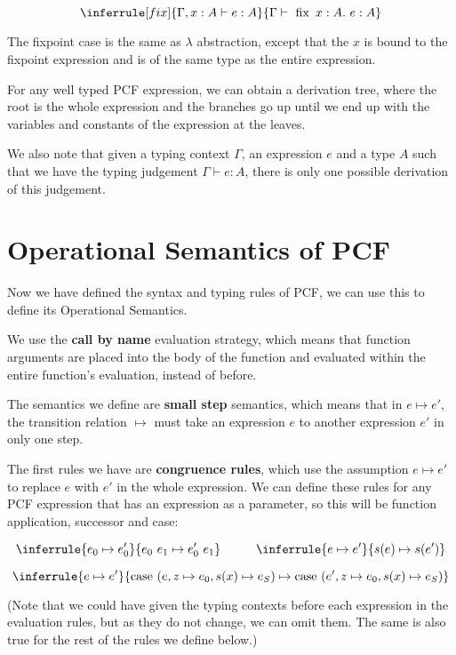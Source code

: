 $$
\inferrule [fix]{\Gamma, x : A \vdash e : A }
  {\Gamma \vdash \  \fix \ x:A . \ e : A}
$$

The fixpoint case is the same as $\lambda$ abstraction, except that the $x$ is bound to the fixpoint expression and is of the same type as the entire expression.

\vspace{0.5cm}

For any well typed PCF expression, we can obtain a derivation tree, where the root is the whole expression and the branches go up until we end up with the variables and constants of the expression at the leaves.

We also note that given a typing context $\Gamma$, an expression $e$ and a type $A$ such that we have the typing judgement $\Gamma \vdash e : A$, there is only one possible derivation of this judgement.

\chapter{Operational Semantics of PCF}\label{ch4}
Now we have defined the syntax and typing rules of PCF, we can use this to define its Operational Semantics.

We use the \textbf{call by name} evaluation strategy, which means that function arguments are placed into the body of the function and evaluated within the entire function's evaluation, instead of before.

The semantics we define are \textbf{small step} semantics, which means that in $e \mapsto e'$, the transition relation $\mapsto$ must take an expression $e$ to another expression $e'$ in only one step.

The first rules we have are \textbf{congruence rules}, which use the assumption $e \mapsto e'$ to replace $e$ with $e'$ in the whole expression. We can define these rules for any PCF expression that has an expression as a parameter, so this will be function application, successor and case:

$$
\inferrule { e_0 \mapsto e_0'} {e_0 \ e_1 \mapsto e_0' \ e_1}
\hspace{1cm}
\inferrule { e \mapsto e'} {s(e) \mapsto s(e')}
$$

$$
\inferrule { e \mapsto e'} {\case \ (e, z \mapsto e_0 , s(x) \mapsto e_S) \mapsto \case \ (e', z \mapsto e_0 , s(x) \mapsto e_S)}
$$

(Note that we could have given the typing contexts before each expression in the evaluation rules, but as they do not change, we can omit them. The same is also true for the rest of the rules we define below.) 

